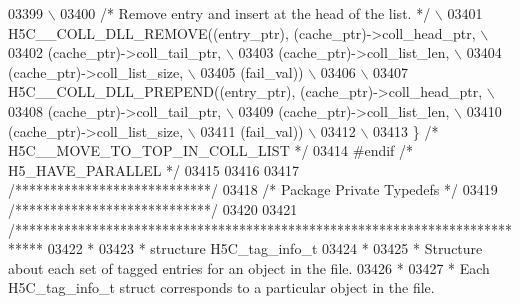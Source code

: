 \begin{DoxyCode}
03399 \textcolor{preprocessor}{                                                                        \(\backslash\)}
03400 \textcolor{preprocessor}{    }\textcolor{comment}{/* Remove entry and insert at the head of the list. */}\textcolor{preprocessor}{              \(\backslash\)}
03401 \textcolor{preprocessor}{    H5C\_\_COLL\_DLL\_REMOVE((entry\_ptr), (cache\_ptr)->coll\_head\_ptr,       \(\backslash\)}
03402 \textcolor{preprocessor}{                         (cache\_ptr)->coll\_tail\_ptr,                    \(\backslash\)}
03403 \textcolor{preprocessor}{                         (cache\_ptr)->coll\_list\_len,                    \(\backslash\)}
03404 \textcolor{preprocessor}{                         (cache\_ptr)->coll\_list\_size,                   \(\backslash\)}
03405 \textcolor{preprocessor}{                         (fail\_val))                                    \(\backslash\)}
03406 \textcolor{preprocessor}{                                                                        \(\backslash\)}
03407 \textcolor{preprocessor}{    H5C\_\_COLL\_DLL\_PREPEND((entry\_ptr), (cache\_ptr)->coll\_head\_ptr,      \(\backslash\)}
03408 \textcolor{preprocessor}{                          (cache\_ptr)->coll\_tail\_ptr,                   \(\backslash\)}
03409 \textcolor{preprocessor}{                          (cache\_ptr)->coll\_list\_len,                   \(\backslash\)}
03410 \textcolor{preprocessor}{                          (cache\_ptr)->coll\_list\_size,                  \(\backslash\)}
03411 \textcolor{preprocessor}{                          (fail\_val))                                   \(\backslash\)}
03412 \textcolor{preprocessor}{                                                                        \(\backslash\)}
03413 \textcolor{preprocessor}{\} }\textcolor{comment}{/* H5C\_\_MOVE\_TO\_TOP\_IN\_COLL\_LIST */}\textcolor{preprocessor}{}
03414 \textcolor{preprocessor}{#endif }\textcolor{comment}{/* H5\_HAVE\_PARALLEL */}\textcolor{preprocessor}{}
03415 
03416 
03417 \textcolor{comment}{/****************************/}
03418 \textcolor{comment}{/* Package Private Typedefs */}
03419 \textcolor{comment}{/****************************/}
03420 
03421 \textcolor{comment}{/****************************************************************************}
03422 \textcolor{comment}{ *}
03423 \textcolor{comment}{ * structure H5C\_tag\_info\_t}
03424 \textcolor{comment}{ *}
03425 \textcolor{comment}{ * Structure about each set of tagged entries for an object in the file.}
03426 \textcolor{comment}{ *}
03427 \textcolor{comment}{ * Each H5C\_tag\_info\_t struct corresponds to a particular object in the file.}

\end{DoxyCode}
